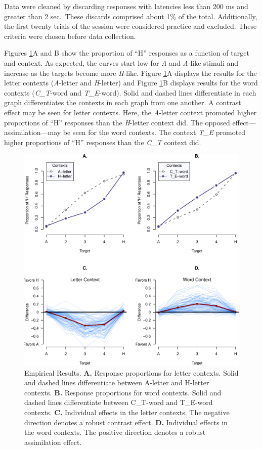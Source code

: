 \documentclass[english,floatsintext,man]{apa6}
\theoremstyle{definition}
\theoremstyle{definition}
\theoremstyle{definition}
\theoremstyle{remark}
\begin{document}
Data were cleaned by discarding responses with latencies less than 200
ms and greater than 2 sec.~These discards comprised about 1\% of the
total. Additionally, the first twenty trials of the session were
considered practice and excluded. These criteria were chosen before data
collection.

Figures \ref{fig:avcfigures}A and B show the proportion of \enquote{H}
responses as a function of target and context. As expected, the curves
start low for \emph{A} and \emph{A}-like stimuli and increase as the
targets become more \emph{H}-like. Figure \ref{fig:avcfigures}A displays
the results for the letter contexts (\emph{A}-letter and
\emph{H}-letter) and Figure \ref{fig:avcfigures}B displays results for
the word contexts (\emph{C\_T}-word and \emph{T\_E}-word). Solid and
dashed lines differentiate in each graph differentiates the contexts in
each graph from one another. A contrast effect may be seen for letter
contexts. Here, the \emph{A}-letter context promoted higher proportions
of \enquote{H} responses than the \emph{H}-letter context did. The
opposed effect---assimilation---may be seen for the word contexts. The
context \emph{T\_E} promoted higher proportions of \enquote{H} responses
than the \emph{C\_T} context did.

\begin{figure}[htbp]
\centering
\includegraphics{paper_files/figure-latex/avcfigures-1.pdf}
\caption{\label{fig:avcfigures}Empirical Results. \textbf{A.} Response
proportions for letter contexts. Solid and dashed lines differentiate
between A-letter and H-letter contexts. \textbf{B.} Response proportions
for word contexts. Solid and dashed lines differentiate between
C\_T-word and T\_E-word contexts. \textbf{C.} Individual effects in the
letter contexts. The negative direction denotes a robust contrast
effect. \textbf{D.} Individual effects in the word contexts. The
positive direction denotes a robust assimilation effect.}
\end{figure}
\end{document}
